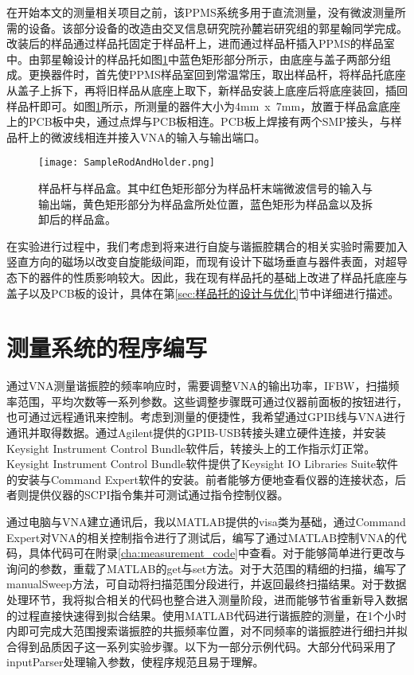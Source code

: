             在开始本文的测量相关项目之前，该PPMS系统多用于直流测量，没有微波测量所需的设备。该部分设备的改造由交叉信息研究院孙麓岩研究组的郭星翰同学完成。改装后的样品通过样品托固定于样品杆上，进而通过样品杆插入PPMS的样品室中。由郭星翰设计的样品托如图\ref{fig:samplerodHolder}中蓝色矩形部分所示，由底座与盖子两部分组成。更换器件时，首先使PPMS样品室回到常温常压，取出样品杆，将样品托底座从盖子上拆下，再将旧样品从底座上取下，新样品安装上底座后将底座装回，插回样品杆即可。如图\ref{fig:samplerodHolder}所示，所测量的器件大小为4mm~x~7mm，放置于样品盒底座上的PCB板中央，通过点焊与PCB板相连。PCB板上焊接有两个SMP接头，与样品杆上的微波线相连并接入VNA的输入与输出端口。


\begin{figure}[h]
  \centering%
  \texttt{[image: SampleRodAndHolder.png]}
  \caption{样品杆与样品盒。其中红色矩形部分为样品杆末端微波信号的输入与输出端，黄色矩形部分为样品盒所处位置，蓝色矩形为样品盒以及拆卸后的样品盒。}
  \label{fig:samplerodHolder}
\end{figure}

            在实验进行过程中，我们考虑到将来进行自旋与谐振腔耦合的相关实验时需要加入竖直方向的磁场以改变自旋能级间距，而现有设计下磁场垂直与器件表面，对超导态下的器件的性质影响较大。因此，我在现有样品托的基础上改进了样品托底座与盖子以及PCB板的设计，具体在第\ref{sec:样品托的设计与优化}节中详细进行描述。
                

            \section{测量系统的程序编写} %
            \label{sec:测量系统}
            通过VNA测量谐振腔的频率响应时，需要调整VNA的输出功率，IFBW，扫描频率范围，平均次数等一系列参数。这些调整步骤既可通过仪器前面板的按钮进行，也可通过远程通讯来控制。考虑到测量的便捷性，我希望通过GPIB线与VNA进行通讯并取得数据。通过Agilent提供的GPIB-USB转接头建立硬件连接，并安装Keysight Instrument Control Bundle软件后，转接头上的工作指示灯正常。Keysight Instrument Control Bundle软件提供了Keysight IO Libraries Suite软件的安装与Command Expert软件的安装。前者能够方便地查看仪器的连接状态，后者则提供仪器的SCPI指令集并可测试通过指令控制仪器。

            通过电脑与VNA建立通讯后，我以MATLAB提供的visa类为基础，通过Command Expert对VNA的相关控制指令进行了测试后，编写了通过MATLAB控制VNA的代码，具体代码可在附录\ref{cha:measurement_code}中查看。对于能够简单进行更改与询问的参数，重载了MATLAB的get与set方法。对于大范围的精细的扫描，编写了manualSweep方法，可自动将扫描范围分段进行，并返回最终扫描结果。对于数据处理环节，我将拟合相关的代码也整合进入测量阶段，进而能够节省重新导入数据的过程直接快速得到拟合结果。使用MATLAB代码进行谐振腔的测量，在1个小时内即可完成大范围搜索谐振腔的共振频率位置，对不同频率的谐振腔进行细扫并拟合得到品质因子这一系列实验步骤。以下为一部分示例代码。大部分代码采用了inputParser处理输入参数，使程序规范且易于理解。

